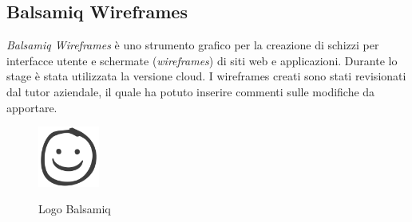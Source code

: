 	\subsection{Balsamiq Wireframes}
	\emph{Balsamiq Wireframes} è uno strumento grafico per la creazione di schizzi per interfacce utente e schermate (\emph{wireframes}) di siti web e applicazioni. Durante lo stage è stata utilizzata la versione cloud. I wireframes creati sono stati revisionati dal tutor aziendale, il quale ha potuto inserire commenti sulle modifiche da apportare. 
	
		\begin{figure}[H]
		\centering
		\includegraphics[width=2cm]{immagini/balsamiq.png} \\
		\caption{\label{fig:logo_balsamiq} Logo Balsamiq}
	\end{figure}
	










